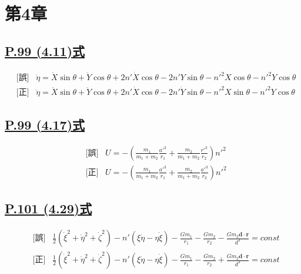 \documentclass[9pt,fleqn]{bxjsarticle}
\begin{document}
\section*{第4章}

\subsection*{\underline{P.99 (4.11)式}}
\begin{align*}
    &\text{[誤]} \hspace{10pt} \ddot{\eta} = \ddot{X}\sin{\theta} + \ddot{Y}\cos{\theta} + 2n'\dot{X}\cos{\theta} - 2n'Y\sin{\theta} - n'^2X\cos{\theta} - n'^2Y\cos{\theta} \\
    &\text{[正]} \hspace{10pt} \ddot{\eta} = \ddot{X}\sin{\theta} + \ddot{Y}\cos{\theta} + 2n'\dot{X}\cos{\theta} - 2n'\dot{Y}\sin{\theta} - n'^2X\sin{\theta} - n'^2Y\cos{\theta} 
\end{align*}

\subsection*{\underline{P.99 (4.17)式}}
\begin{align*}
    &\text{[誤]} \hspace{10pt} U = -\left(\frac{m_1}{m_1+m_2}\frac{a'^3}{r_1}+\frac{m_2}{m_1+m_2}\frac{r'^3}{r_2}\right)n'^2 \\
    &\text{[正]} \hspace{10pt} U = -\left(\frac{m_1}{m_1+m_2}\frac{a'^3}{r_1}+\frac{m_2}{m_1+m_2}\frac{a'^3}{r_2}\right)n'^2 
\end{align*}

\subsection*{\underline{P.101 (4.29)式}}
\begin{align*}
    &\text{[誤]} \hspace{10pt} \frac{1}{2}\left(\dot{\xi}^2+\dot{\eta}^2+\dot{\zeta}^2\right) - n'\left(\xi\dot{\eta}-\eta\dot{\xi}\right) - \frac{Gm_1}{r_1} - \frac{Gm_2}{r_2} - \frac{Gm_2\bm{d}\cdot\bm{r}}{d^3} = const \\
    &\text{[正]} \hspace{10pt} \frac{1}{2}\left(\dot{\xi}^2+\dot{\eta}^2+\dot{\zeta}^2\right) - n'\left(\xi\dot{\eta}-\eta\dot{\xi}\right) - \frac{Gm_1}{r_1} - \frac{Gm_2}{r_2} + \frac{Gm_2\bm{d}\cdot\bm{r}}{d^3} = const 
\end{align*}
\end{document}
